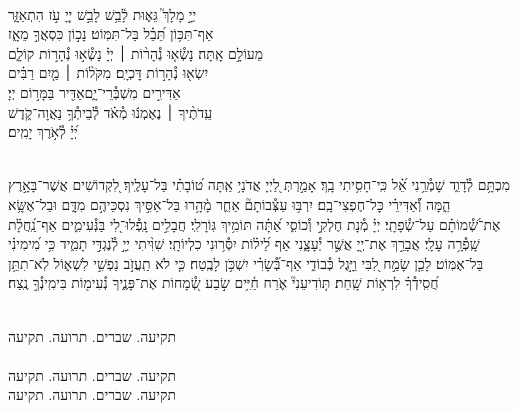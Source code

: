\documentclass[twoside, openany, parskip=half, 11pt]{book}
\begin{document}
{\\
\vspace{-1.5\baselineskip}
\begin{narrow}
יְיָ֣ מָלָךְ֮ גֵּא֢וּת לָ֫בֵ֥שׁ\hfill
לָבֵ֣שׁ יְיָ֭ עֹ֣ז הִתְאַזָּ֑ר\\ אַף־תִּכּ֥וֹן תֵּ֝בֵ֗ל בַּל־תִּמּֽוֹט׃ \hfill
נָכ֣וֹן כִּסְאֲךָ֣ מֵאָ֑ז\\ מֵעוֹלָ֣ם אָֽתָּה׃ \hfill
נָשְׂ֯א֤וּ נְ֯הָר֨וֹת ׀ יְיָ֗ נָשְׂ֯א֣וּ נְ֯הָר֣וֹת קוֹלָ֑ם\\ יִשְׂא֖וּ נְ֯הָר֣וֹת דׇּכְיָֽם׃ \hfill
מִקֹּל֨וֹת ׀ מַ֤יִם רַבִּ֗ים\\ אַדִּירִ֣ים מִשְׁבְּ֯רֵי־יָ֑ם\hfill אַדִּ֖יר בַּמָּר֣וֹם יְיָ׃ \\
עֵֽדֹתֶ֨יךָ ׀ נֶאֶמְנ֬וּ מְ֯אֹ֗ד \hfill לְ֯בֵיתְ֯ךָ֥ נַאֲוָה־קֹ֑דֶשׁ\\ יְ֝יָ֗ לְ֯אֹ֣רֶךְ יָמִֽים׃ \hfill \break
\end{narrow}
}

\weekdayshir

\label{kaddish_yasom_shacharis}


\mournerskaddish

\begin{sometimes}

\\
%
מִכְתָּ֥ם לְ֯דָוִ֑ד שָׁמְ֯רֵ֥נִי אֵ֝֗ל כִּֽי־חָסִ֥יתִי בָֽךְ׃ אָמַ֣רְתְּ לַ֭יְיָ אֲדֹנָי֥ אַֽתָּה ט֝וֹבָתִ֗י בַּל־עָלֶֽיךָ׃ לִ֭קְדוֹשִׁים אֲשֶׁר־בָּאָ֣רֶץ הֵ֑מָּה וְ֝֯אַדִּירֵ֗י כׇּל־חֶפְצִי־בָֽם׃ יִרְבּ֥וּ עַצְּ֯בוֹתָם֘ אַחֵ֢ר מָ֫הָ֥רוּ בַּל־אַסִּ֣יךְ נִסְכֵּיהֶ֣ם מִדָּ֑ם וּבַל־אֶשָּׂ֥א אֶת־שְׁ֝֯מוֹתָ֗ם עַל־שְׂ֯פָתָֽי׃ יְיָ֗ מְ֯נָת חֶלְקִ֣י וְ֯כוֹסִ֑י אַ֝תָּ֗ה תּוֹמִ֥יךְ גּֽוֹרָלִֽי׃ חֲבָלִ֣ים נָֽפְ֯לוּ־לִ֭י בַּנְּ֯עִימִ֑ים אַף־נַֽ֝חֲלָ֗ת שָֽׁפְ֯רָ֥ה עָלָֽי׃ אֲבָרֵ֣ךְ אֶת־יְ֖יָ אֲשֶׁ֣ר יְ֯עָצָ֑נִי אַף לֵ֝יל֗וֹת יִסְּ֯ר֥וּנִי כִלְיוֹתָֽי׃ שִׁוִּ֨יתִי יְיָ֣ לְ֯נֶגְדִּ֣י תָמִ֑יד כִּ֥י מִ֝ימִינִ֗י בַּל־אֶמּֽוֹט׃ לָכֵ֤ן שָׂמַ֣ח לִ֭בִּי וַיָּ֣גֶל כְּ֯בוֹדִ֑י אַף־בְּ֝֯שָׂרִ֗י יִשְׁכֹּ֥ן לָבֶֽטַח׃ כִּ֤י לֹא תַֽעֲזֹ֣ב נַפְשִׁ֣י לִשְׁא֑וֹל לֹֽא־תִתֵּ֥ן חֲ֝סִֽידְ֯ךָ֗ לִרְא֥וֹת שָֽׁחַת׃ תּ֤וֹדִיעֵנִי֘ אֹ֢רַח חַ֫יִּ֥ים שׂ֣בַע שְׂ֭֯מָחוֹת אֶת־פָּנֶ֑יךָ נְ֯עִימ֖וֹת בִּימִֽינְ֯ךָ֣ נֶֽצַח׃

\end{sometimes}



\begin{sometimes}

\\
תקיעה. שברים. תרועה. תקיעה\\
\\
תקיעה. שברים. תרועה. תקיעה\\
תקיעה. שברים. תרועה. תקיעה

\end{sometimes}
\end{document}
